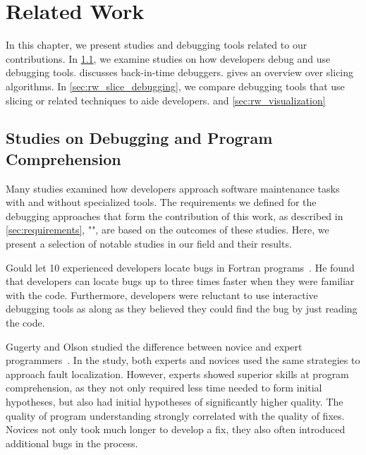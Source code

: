 
\chapter{Related Work}
\label{sec:relatedwork}

In this chapter, we present studies and debugging tools related to our contributions.
In \cref{sec:rw_studies}, we examine studies on how developers debug and use debugging tools.
 discusses back-in-time debuggers.
 gives an overview over slicing algorithms.
In \cref{sec:rw_slice_debugging}, we compare debugging tools that use slicing or related techniques to aide developers.
 and 
\cref{sec:rw_visualization}


\section{Studies on Debugging and Program Comprehension}
\label{sec:rw_studies}

Many studies examined how developers approach software maintenance tasks with and without specialized tools.
The requirements we defined for the debugging approaches that form the contribution of this work, as described in \cref{sec:requirements}, "", are based on the outcomes of these studies.
Here, we present a selection of notable studies in our field and their results.

Gould let 10 experienced developers locate bugs in Fortran programs~\cite{gould75:some_psychological_evidence}.
He found that developers can locate bugs up to three times faster when they were familiar with the code.
Furthermore, developers were reluctant to use interactive debugging tools as along as they believed they could find the bug by just reading the code.

Gugerty and Olson studied the difference between novice and expert programmers~\cite{gugerty86:comprehension_differences_in_debugging}.
In the study, both experts and novices used the same strategies to approach fault localization.
However, experts showed superior skills at program comprehension, as they not only required less time needed to form initial hypotheses, but also had initial hypotheses of significantly higher quality.
The quality of program understanding strongly correlated with the quality of fixes.
Novices not only took much longer to develop a fix, they also often introduced additional bugs in the process.

